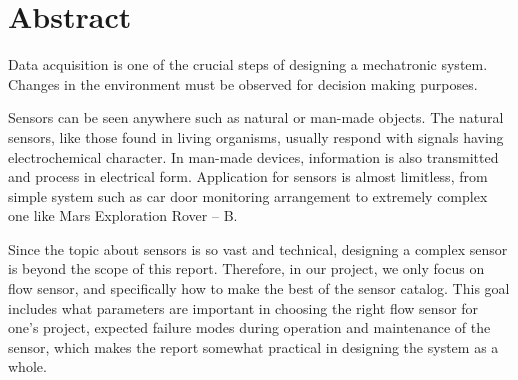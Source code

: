 \chapter*{Abstract}
Data acquisition is one of the crucial steps of designing a mechatronic system. Changes in the environment must be observed for decision making purposes.

Sensors can be seen anywhere such as natural or man-made objects. The natural sensors, like those found in living organisms, usually respond with signals having electrochemical character. In man-made devices, information is also transmitted and process in electrical form. Application for sensors is almost limitless, from simple system such as car door monitoring arrangement to extremely complex one like Mars Exploration Rover – B.

Since the topic about sensors is so vast and technical, designing a complex sensor is beyond the scope of this report. Therefore, in our project, we only focus on flow sensor, and specifically how to make the best of the sensor catalog. This goal includes what parameters are important in choosing the right flow sensor for one's project, expected failure modes during operation and maintenance of the sensor, which makes the report somewhat practical in designing the system as a whole.